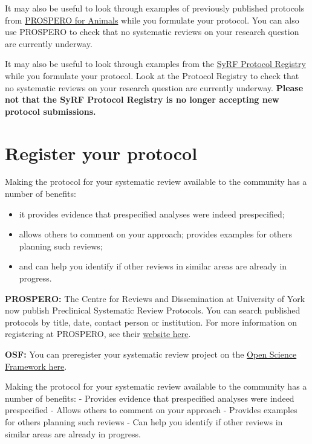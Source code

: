 \documentclass[
]{book}
\providecommand{\tightlist}{%
  \setlength{\itemsep}{0pt}\setlength{\parskip}{0pt}}
\begin{document}
It may also be useful to look through examples of previously published protocols from \href{https://www.crd.york.ac.uk/prospero/\#searchadvanced}{PROSPERO for Animals} while you formulate your protocol. You can also use PROSPERO to check that no systematic reviews on your research question are currently underway.

It may also be useful to look through examples from the \href{http://syrf.org.uk/protocols/}{SyRF Protocol Registry} while you formulate your protocol. Look at the Protocol Registry to check that no systematic reviews on your research question are currently underway. \textbf{Please not that the SyRF Protocol Registry is no longer accepting new protocol submissions.}

\hypertarget{register-your-protocol}{%
\section{Register your protocol}\label{register-your-protocol}}

Making the protocol for your systematic review available to the community has a number of benefits:

\begin{itemize}
\tightlist
\item
  it provides evidence that prespecified analyses were indeed prespecified;
\item
  allows others to comment on your approach; provides examples for others planning such reviews;
\item
  and can help you identify if other reviews in similar areas are already in progress.
\end{itemize}

\textbf{PROSPERO:}
The Centre for Reviews and Dissemination at University of York now publish Preclinical Systematic Review Protocols. You can search published protocols by title, date, contact person or institution.
For more information on registering at PROSPERO, see their \href{https://www.crd.york.ac.uk/prospero/}{website here}.

\textbf{OSF:}
You can preregister your systematic review project on the \href{https://osf.io/prereg/}{Open Science Framework here}.

Making the protocol for your systematic review available to the community has a number of benefits:
- Provides evidence that prespecified analyses were indeed prespecified
- Allows others to comment on your approach
- Provides examples for others planning such reviews
- Can help you identify if other reviews in similar areas are already in progress.
\end{document}
